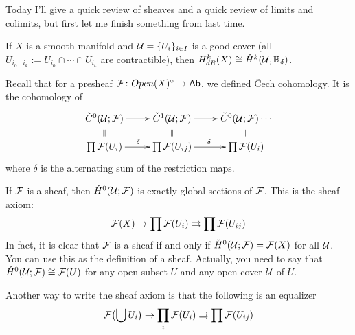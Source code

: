 
Today I'll give a quick review of sheaves and a quick review of limits and colimits, but first let me finish something from last time.
\begin{theorem}
 If $X$ is a smooth manifold and $\mathcal{U}=\{U_i\}_{i\in I}$ is a good cover (all $U_{i_0\dots i_k}:=U_{i_0}\cap\cdots \cap U_{i_k}$ are contractible), then $H^k_{dR}(X)\cong \check H^k(\mathcal{U},\mathbb{R}_\delta)$.
\end{theorem}
Recall that for a presheaf $\mathcal{F}\colon Open(X)^\circ \to \text{\sf Ab}$, we defined \v Cech cohomology. It is the cohomology of
\[\xymatrix @R-1pc{
 \check C^0(\U;\F)\ar[r] & \check C^1(\U;\F)\ar[r]& \check C^0(\U;\F)\cdots\\
 \prod \F(U_i) \ar[r]^\delta \ar@{}[u]|\parallel & \prod \F(U_{ij}) \ar[r]^\delta \ar@{}[u]|\parallel & \prod \F(U_i) \ar@{}[u]|\parallel
}\]
where $\delta$ is the alternating sum of the restriction maps.
\begin{remark}
 If $\mathcal{F}$ is a sheaf, then $\check H^0(\mathcal{U};\mathcal{F})$ is exactly global sections of $\mathcal{F}$. This is the sheaf axiom:
 \[
  \mathcal{F}(X)\to \prod \mathcal{F}(U_i)\rightrightarrows \prod \mathcal{F}(U_{ij})
 \]
 In fact, it is clear that $\mathcal{F}$ is a sheaf if and only if $\check H^0(\mathcal{U};\mathcal{F})=\mathcal{F}(X)$ for all $\mathcal{U}$. You can use this as the definition of a sheaf. Actually, you need to say that $\check H^0(\mathcal{U};\mathcal{F})\cong \mathcal{F}(U)$ for any open subset $U$ and any open cover $\mathcal{U}$ of $U$.
 
 Another way to write the sheaf axiom is that the following is an equalizer
 \[
  \mathcal{F}\bigl(\bigcup U_i\bigr)\to \prod_i \mathcal{F}(U_i)\rightrightarrows \prod \mathcal{F}(U_{ij})
 \]
\end{remark}


